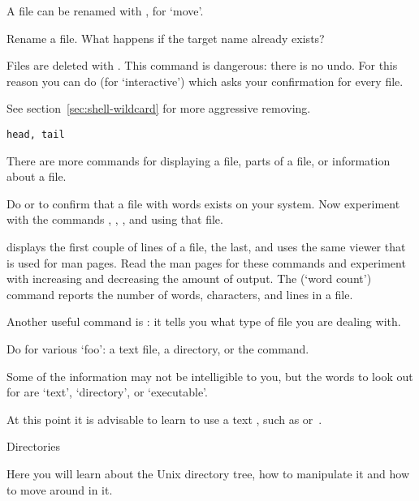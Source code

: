 A file can be renamed with , for `move'.

\begin{exercise}
  Rename a file. What happens if the target name already exists?
\end{exercise}


Files are deleted with . This command is dangerous: there is no
undo.
For this reason you can do  (for `interactive') which
asks your confirmation for every file.

See section~\ref{sec:shell-wildcard} for more aggressive removing.

 {\texttt{head, tail}}

There are more commands for displaying a file, parts of a file, or
information about a file. 

\begin{exercise}
  Do  or  to
  confirm that a file with words exists on your system. Now experiment
  with the commands , , , and  using
  that file.
\end{exercise}
\begin{outcome}
   displays the first couple of lines of a file,
   the last, and  uses the
  same viewer that is used for man pages. Read the man pages for these
  commands and experiment with increasing and decreasing the amount of
  output.  The  (`word count') command reports the
  number of words, characters, and lines in a file.
\end{outcome}

Another useful command is : it tells you what
type of file you are dealing with.

\begin{exercise}
  Do  for various `foo': a text file, a directory, or the
   command.
\end{exercise}
\begin{outcome}
  Some of the information may not be intelligible to you, but the
  words to look out for are `text', `directory', or `executable'.
\end{outcome}

At this point it is advisable to learn to use a text
, such as  or~.

 {Directories}

\begin{purpose}
  Here you will learn about the Unix directory tree, how to manipulate
  it and how to move around in it.
\end{purpose}

